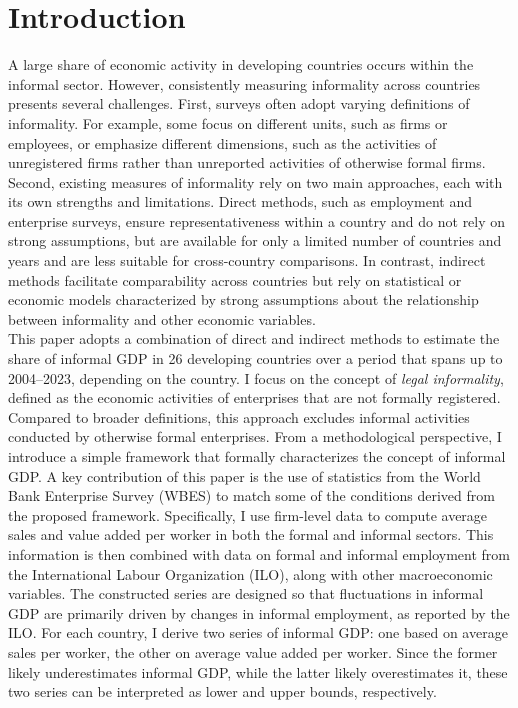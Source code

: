\documentclass[letterpaper, 12pt]{article}
\begin{document}
\section{Introduction}
A large share of economic activity in developing countries occurs within the informal sector. However, consistently measuring informality across countries presents several challenges. First, surveys often adopt varying definitions of informality. For example, some focus on different units, such as firms or employees, or emphasize different dimensions, such as the activities of unregistered firms rather than unreported activities of otherwise formal firms. Second, existing measures of informality rely on two main approaches, each with its own strengths and limitations. Direct methods, such as employment and enterprise surveys, ensure representativeness within a country and do not rely on strong assumptions, but are available for only a limited number of countries and years and are less suitable for cross-country comparisons. In contrast, indirect methods facilitate comparability across countries but rely on statistical or economic models characterized by strong assumptions about the relationship between informality and other economic variables. 
\\This paper adopts a combination of direct and indirect methods to estimate the share of informal GDP in 26 developing countries over a period that spans up to 2004–2023, depending on the country. I focus on the concept of \textit{legal informality}, defined as the economic activities of enterprises that are not formally registered. Compared to broader definitions, this approach excludes informal activities conducted by otherwise formal enterprises. From a methodological perspective, I introduce a simple framework that formally characterizes the concept of informal GDP. A key contribution of this paper is the use of statistics from the World Bank Enterprise Survey (WBES) to match some of the conditions derived from the proposed framework. Specifically, I use firm-level data to compute average sales and value added per worker in both the formal and informal sectors. This information is then combined with data on formal and informal employment from the International Labour Organization (ILO), along with other macroeconomic variables. The constructed series are designed so that fluctuations in informal GDP are primarily driven by changes in informal employment, as reported by the ILO. For each country, I derive two series of informal GDP: one based on average sales per worker, the other on average value added per worker. Since the former likely underestimates informal GDP, while the latter likely overestimates it, these two series can be interpreted as lower and upper bounds, respectively.
\end{document}
